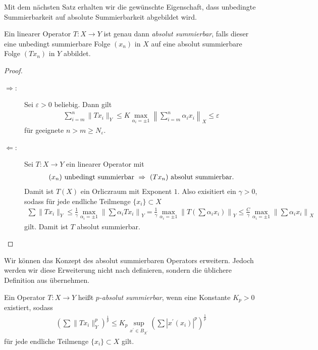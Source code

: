 Mit dem nächsten Satz erhalten wir die gewünschte Eigenschaft, dass unbedingte Summierbarkeit auf absolute Summierbarkeit abgebildet wird.


\begin{sz}\label{th:abs_sum_equiv}
	Ein linearer Operator $ T : X \to Y $ ist genau dann \textit{absolut summierbar}, falls dieser eine unbedingt summierbare Folge $ (x_n) $ in $ X $ auf eine absolut summierbare Folge $ (Tx_n) $ in $ Y $ abbildet.
\end{sz}

\begin{proof}
	\begin{description}
		\item[\glqq$ \Rightarrow $\grqq:]
		Sei $ \varepsilon > 0  $ beliebig.
		Dann gilt 
		\begin{align*}
			\sum \limits_{i = m}^n \|Tx_i\|_Y
			\leq K \max \limits_{\alpha_i = \pm 1} 
			\left\|
			\sum \limits_{i =  m}^n \alpha_i x_i
			\right\|_X \leq \varepsilon
		\end{align*} 
		für geeignete $ n >m \geq N_\varepsilon $.
		
		\item[\glqq$ \Leftarrow $\grqq:]
		Sei $ T : X \to Y $ ein linearer Operator mit
		\begin{align*}
			\textrm{$ (x_n) $ unbedingt summierbar} 
			\ \Rightarrow \
			\textrm{$ (Tx_n) $ absolut summierbar}. 
		\end{align*}
		Damit ist $ T(X) $ ein Orliczraum mit Exponent $ 1 $. Also exisitiert ein $ \gamma > 0 $, sodass für jede endliche Teilmenge $ \{x_i\} \subset X $
		\begin{align*}
			\sum \|T x_i \|_Y
			\leq 
			\frac{1}{\gamma} 
			\max \limits_{\alpha_i = \pm 1}
			\left\|
			\sum \alpha_i T x_i
			\right\|_Y
			= 
			\frac{1}{\gamma} 
			\max \limits_{\alpha_i = \pm 1}
			\left\|
			T
			\left(
			\sum \alpha_i  x_i
			\right)
			\right\|_Y
			\leq 
			\frac{C}{\gamma}
			\max \limits_{\alpha_i = \pm 1}
			\left\|
			\sum \alpha_i  x_i
			\right\|_X
		\end{align*}
		gilt.
		Damit ist $ T $ absolut summierbar.
	\end{description}
\end{proof}

Wir können das Konzept des absolut summierbaren Operators erweitern.
Jedoch werden wir diese Erweiterung nicht nach \cite{Kadets1997} definieren, sondern die üblichere Definition aus \cite{Diestel1995} übernehmen.
\newpage
\begin{df}
	Ein Operator $ T : X \to Y $ heißt \textit{$ p $-absolut summierbar}, wenn eine Konstante $ K_p > 0 $ existiert, sodass
	\begin{align}\label{eq:abs_sum_cond_p}
		\left(\sum \| T x_i \|_Y^p\right)^\frac{1}{p} 
		\leq K_p 
		\sup \limits_{ x^\prime \in B_{X^\prime}} 
		\left(
		\sum 
		|x^\prime(x_i)|^p
		\right)^\frac{1}{p}
	\end{align}
	für jede endliche Teilmenge $ \{ x_i\} \subset X $ gilt.
\end{df}

